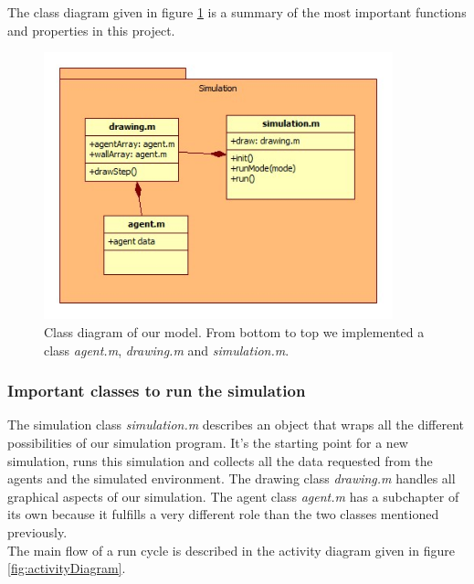 \noi The class diagram given in figure \ref{fig:classpackage} is a summary of the most important functions and properties in this project.\\

\begin{figure}[h!]
	\centering
		\includegraphics[width=0.9\textwidth]{pictures/classpackage}
	\caption{Class diagram of our model. From bottom to top we implemented a class \textit{agent.m}, \textit{drawing.m} and \textit{simulation.m}.}
	\label{fig:classpackage}
\end{figure}

\subsubsection{Important classes to run the simulation}
\noi The simulation class \textit{simulation.m} describes an object that wraps all the different possibilities of our simulation program. It's the starting point for a new simulation, runs this simulation and collects all the data requested from the agents and the simulated environment. The drawing class \textit{drawing.m} handles all graphical aspects of our simulation. The agent class \textit{agent.m} has a subchapter of its own because it fulfills a very different role than the two classes mentioned previously.\\
The main flow of a run cycle is described in the activity diagram given in figure \ref{fig:activityDiagram}.\\


